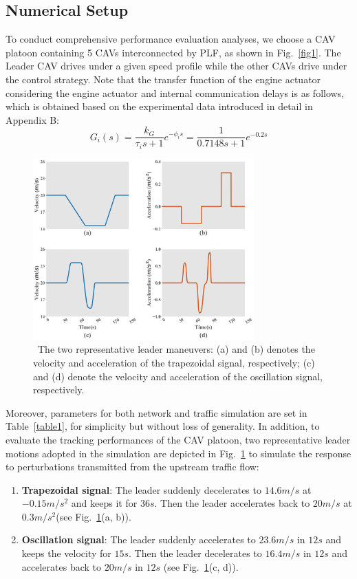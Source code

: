 \documentclass[journal]{IEEEtran}
\begin{document}
\subsection{Numerical Setup}
\label{Section 5.1}

To conduct comprehensive performance evaluation analyses, we choose a CAV platoon containing 5 CAVs interconnected by PLF, as shown in Fig.~\ref{fig1}. The Leader CAV drives under a given speed profile while the other CAVs drive under the control strategy. Note that the transfer function of the engine actuator considering the engine actuator and internal communication delays is as follows, which is obtained based on the experimental data introduced in detail in Appendix B:
\begin{equation}
  G_i(s)=\frac{k_G}{\tau_is+1}e^{-\phi_is}=\frac{1}{0.7148s+1}e^{-0.2s}
  \label{eq51}
\end{equation}

\begin{figure}

  \centering
  \includegraphics[width=8.5cm]{figs/fig2.png}
  \caption{~The two representative leader maneuvers: (a) and (b) denotes the velocity and acceleration of the trapezoidal signal, respectively; (c) and (d) denote the velocity and acceleration of the oscillation signal, respectively.}
  \label{fig2}

\end{figure}

Moreover, parameters for both network and traffic simulation are set in Table~\ref{table1}, for simplicity but without loss of generality. In addition, to evaluate the tracking performances of the CAV platoon, two representative leader motions adopted in the simulation are depicted in Fig.~\ref{fig2} to simulate the response to perturbations transmitted from the upstream traffic flow:
\begin{enumerate}
  \item \textbf{Trapezoidal signal}: The leader suddenly decelerates to $14.6m/s$ at $ - 0.15m/{s^2}$ and keeps it for $36s$. Then the leader accelerates back to $20m/s$ at $ 0.3m/{s^2} $(see Fig.~\ref{fig2}(a, b)).
  \item \textbf{Oscillation signal}: The leader suddenly accelerates to $23.6m/s$ in $12s$ and keeps the velocity for $15s$. Then the leader decelerates to $16.4m/s$ in $12s$ and accelerates back to $20m/s$ in $12s$ (see Fig.~\ref{fig2}(c, d)).
\end{enumerate}
\end{document}
